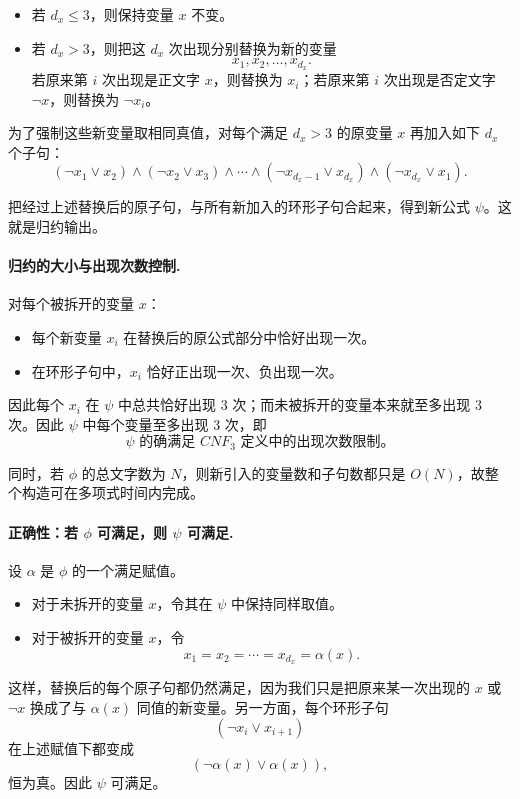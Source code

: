 \begin{answerred}
\begin{itemize}
  \item 若 $d_x \le 3$，则保持变量 $x$ 不变。
  \item 若 $d_x > 3$，则把这 $d_x$ 次出现分别替换为新的变量
  \[
  x_1,x_2,\dots,x_{d_x}.
  \]
  若原来第 $i$ 次出现是正文字 $x$，则替换为 $x_i$；若原来第 $i$ 次出现是否定文字 $\neg x$，则替换为 $\neg x_i$。
\end{itemize}

为了强制这些新变量取相同真值，对每个满足 $d_x>3$ 的原变量 $x$ 再加入如下 $d_x$ 个子句：
\[
(\neg x_1 \vee x_2)\wedge
(\neg x_2 \vee x_3)\wedge \cdots \wedge
(\neg x_{d_x-1} \vee x_{d_x})\wedge
(\neg x_{d_x} \vee x_1).
\]

把经过上述替换后的原子句，与所有新加入的环形子句合起来，得到新公式 $\psi$。这就是归约输出。

\paragraph{归约的大小与出现次数控制.}
对每个被拆开的变量 $x$：

\begin{itemize}
  \item 每个新变量 $x_i$ 在替换后的原公式部分中恰好出现一次。
  \item 在环形子句中，$x_i$ 恰好正出现一次、负出现一次。
\end{itemize}

因此每个 $x_i$ 在 $\psi$ 中总共恰好出现 $3$ 次；而未被拆开的变量本来就至多出现 $3$ 次。因此 $\psi$ 中每个变量至多出现 $3$ 次，即
\[
\psi \text{ 的确满足 } CNF_3 \text{ 定义中的出现次数限制。}
\]

同时，若 $\phi$ 的总文字数为 $N$，则新引入的变量数和子句数都只是 $O(N)$，故整个构造可在多项式时间内完成。

\paragraph{正确性：若 \(\phi\) 可满足，则 \(\psi\) 可满足.}
设 $\alpha$ 是 $\phi$ 的一个满足赋值。

\begin{itemize}
  \item 对于未拆开的变量 $x$，令其在 $\psi$ 中保持同样取值。
  \item 对于被拆开的变量 $x$，令
  \[
  x_1=x_2=\cdots=x_{d_x}=\alpha(x).
  \]
\end{itemize}

这样，替换后的每个原子句都仍然满足，因为我们只是把原来某一次出现的 $x$ 或 $\neg x$ 换成了与 $\alpha(x)$ 同值的新变量。另一方面，每个环形子句
\[
(\neg x_i \vee x_{i+1})
\]
在上述赋值下都变成
\[
(\neg \alpha(x) \vee \alpha(x)),
\]
恒为真。因此 $\psi$ 可满足。


\end{answerred}
